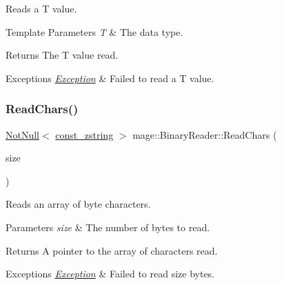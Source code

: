 Reads a {\ttfamily T} value.


\begin{DoxyTemplParams}{Template Parameters}
{\em T} & The data type. \\
\hline
\end{DoxyTemplParams}
\begin{DoxyReturn}{Returns}
The {\ttfamily T} value read. 
\end{DoxyReturn}

\begin{DoxyExceptions}{Exceptions}
{\em \mbox{\hyperlink{classmage_1_1_exception}{Exception}}} & Failed to read a {\ttfamily T} value. \\
\hline
\end{DoxyExceptions}
\mbox{\label{classmage_1_1_binary_reader_a10d3b5300d4a492dd81638faf463dc11}} 
\subsubsection{\texorpdfstring{Read\+Chars()}{ReadChars()}}
{\footnotesize\ttfamily \mbox{\hyperlink{namespacemage_a8769f9d670d6b585ea306cb1062af94b}{Not\+Null}}$<$ \mbox{\hyperlink{namespacemage_abfd9206dc607ceb5d13ec68bf075a5c0}{const\+\_\+zstring}} $>$ mage\+::\+Binary\+Reader\+::\+Read\+Chars (\begin{DoxyParamCaption}\item[{std\+::size\+\_\+t}]{size }\end{DoxyParamCaption})\hspace{0.3cm}{\ttfamily [protected]}}

Reads an array of byte characters.


\begin{DoxyParams}{Parameters}
{\em size} & The number of bytes to read. \\
\hline
\end{DoxyParams}
\begin{DoxyReturn}{Returns}
A pointer to the array of characters read. 
\end{DoxyReturn}

\begin{DoxyExceptions}{Exceptions}
{\em \mbox{\hyperlink{classmage_1_1_exception}{Exception}}} & Failed to read {\ttfamily size} bytes. \\
\hline
\end{DoxyExceptions}
\mbox{\label{classmage_1_1_binary_reader_a67157828a9781644fb55bd7f3558f07c}} 
